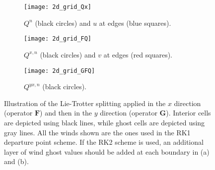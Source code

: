 \begin{figure}[!htb]
	\centering
	\begin{subfigure}{0.3\textwidth}
		\centering
		\texttt{[image: 2d\_grid\_Qx]}
		\caption{$Q^n$ (black circles) and $u$ at edges (blue squares). \label{lt-Qx}}
	\end{subfigure}
	\begin{subfigure}{0.3\textwidth}
		\centering
		\texttt{[image: 2d\_grid\_FQ]}
		\caption{$Q^{x,n}$ (black circles) and $v$ at edges (red squares).\label{lt-FQx} }
	\end{subfigure}
	\begin{subfigure}{0.3\textwidth}
	    \centering
	    \texttt{[image: 2d\_grid\_GFQ]}
		\caption{$Q^{yx,n}$ (black circles). \label{lt-GFQx}}
    \end{subfigure}
	\caption{Illustration of the Lie-Trotter splitting applied in the $x$ direction (operator $\mathbf{F}$)
	and then in the $y$ direction (operator $\mathbf{G}$). Interior cells are depicted using black lines,
	 while ghost cells are depicted using gray lines. 
	 All the winds shown are the ones used in the RK1 departure point scheme.
	 If the RK2 scheme is used, an additional layer of wind ghost values should be added at each boundary in (a) and (b). \label{ltxdir}}
\end{figure}


